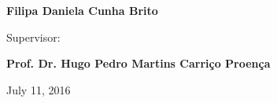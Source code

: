 \vspace{0.2cm}
\begin{center}
\begin{large}
\textbf{Filipa Daniela Cunha Brito}
\end{large}
\end{center}

\vspace{0,5cm}
\begin{center}
\begin{normalsize}
\begin{large}
Supervisor:
\end{large}
\end{normalsize}
\end{center}

\vspace{0.2cm}
\begin{center}
\begin{large}
\textbf{Prof. Dr. Hugo Pedro Martins Carriço Proença}
\end{large}
\end{center}



\vspace{0.5cm}
\begin{center}
\begin{normalsize}
July 11, 2016
\end{normalsize}
\end{center}

